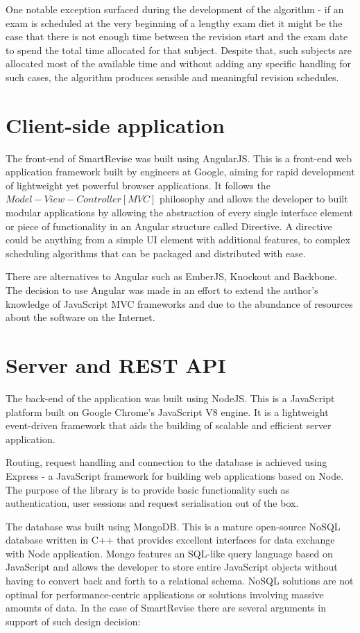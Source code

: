 \documentclass[bsc,frontabs,twoside,singlespacing,parskip]{infthesis}     %
\begin{document}
		One notable exception surfaced during the development of the algorithm - if an exam is scheduled at the very beginning of a lengthy exam diet it might be the case that there is not enough time between the revision start and the exam date to spend the total time allocated for that subject. Despite that, such subjects are allocated most of the available time and without adding any specific handling for such cases, the algorithm produces sensible and meaningful revision schedules.
	
	\section{Client-side application}
	
		The front-end of SmartRevise was built using AngularJS. This is a front-end web application framework built by engineers at Google, aiming for rapid development of lightweight yet powerful browser applications. It follows the $ Model-View-Controller [MVC] $ philosophy and allows the developer to built modular applications by allowing the abstraction of every single interface element or piece of functionality in an Angular structure called Directive. A directive could be anything from a simple UI element with additional features, to complex scheduling algorithms that can be packaged and distributed with ease.
		
		There are alternatives to Angular such as EmberJS, Knockout and Backbone. The decision to use Angular was made in an effort to extend the author's knowledge of JavaScript MVC frameworks and due to the abundance of resources about the software on the Internet.
	
	\section{Server and REST API}
	
		The back-end of the application was built using NodeJS. This is a JavaScript platform built on Google Chrome's JavaScript V8 engine. It is a lightweight event-driven framework that aids the building of scalable and efficient server application. 
		
		Routing, request handling and connection to the database is achieved using Express - a JavaScript framework for building web applications based on Node. The purpose of the library is to provide basic functionality such as authentication, user sessions and request serialisation out of the box.
		
		The database was built using MongoDB. This is a mature open-source NoSQL database written in C++ that provides excellent interfaces for data exchange with Node application. Mongo features an SQL-like query language based on JavaScript and allows the developer to store entire JavaScript objects without having to convert back and forth to a relational schema. NoSQL solutions are not optimal for performance-centric applications or solutions involving massive amounts of data. In the case of SmartRevise there are several arguments in support of such design decision:
		
\end{document}
